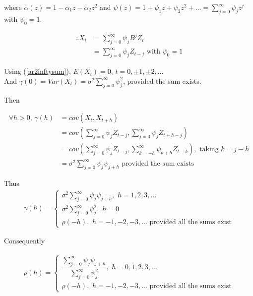 \documentclass[11pt, a4paper]{article}
\begin{document}
where $\alpha (z) = 1 - \alpha_1 z - \alpha_2 z^2$ and $\psi(z) = 1 + \psi_1 z + \psi_2 z^2 + \ldots = \sum \limits_{j = 0}^{\infty} \psi_j z^j$ with $\psi_0 = 1$.


\begin{align}\label{ar2inftysum}
\therefore X_t &= \sum \limits_{j = 0}^{\infty} \psi_j B^j Z_t \nonumber \\[0.25em]
&= \sum \limits_{j = 0}^{\infty} \psi_j Z_{t-j} \,\, \text{with } \psi_0 = 1
\end{align}

Using (\ref{ar2inftysum}), $E(X_t) = 0$, $t = 0, \pm 1, \pm 2, \ldots$ \\

And $\gamma(0) = Var(X_t) = \sigma^2 \sum \limits_{j = 0}^{\infty} \psi_{j}^{2}$, provided the sum exists. \\

\newpage

Then

\begin{align*}
\forall h > 0, \, \gamma(h) &= cov(X_t, X_{t+h}) \\[0.25em]
&= cov\left(\sum \limits_{j = 0}^{\infty} \psi_j Z_{t-j}, \sum \limits_{j = 0}^{\infty} \psi_j Z_{t+h-j}\right) \\[0.25em]
&= cov\left(\sum \limits_{j = 0}^{\infty} \psi_j Z_{t-j}, \sum \limits_{k = -h}^{\infty} \psi_{k+h} Z_{t-k}\right), \,\, \text{taking } k = j - h \\[0.25em]
&= \sigma^2 \sum \limits_{j = 0}^{\infty} \psi_j \psi_{j+h} \,\, \text{provided the sum exists}
\end{align*}

Thus
\begin{align*}
\gamma(h) =
\begin{cases}
\sigma^2 \sum \limits_{j = 0}^{\infty} \psi_j \psi_{j+h}, \,\, h = 1, 2, 3, \ldots \\[1em]
\sigma^2 \sum \limits_{j = 0}^{\infty} \psi_{j}^{2}, \,\, h = 0 \\[1em]
\rho(-h), \,\, h = -1, -2, -3, \ldots \,\, \text{provided all the sums exist}
\end{cases}
\end{align*}

Consequently

\begin{align*}
\rho(h) =
\begin{cases}
\dfrac{\sum \limits_{j = 0}^{\infty} \psi_j \psi_{j+h}}{\sum \limits_{j = 0}^{\infty} \psi_{j}^{2}}, \,\, h = 0, 1, 2, 3, \ldots \\[1.5em]
\rho(-h), \,\, h = -1, -2, -3, \ldots \,\, \text{provided all the sums exist}
\end{cases}
\end{align*}
\end{document}

